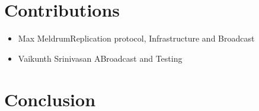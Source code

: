 \documentclass[12pt]{article}
\begin{document}
\section{Contributions}

\begin{itemize}
	\item{Max Meldrum\newline{}\newline{}Replication protocol, Infrastructure and Broadcast}
	\item{Vaikunth Srinivasan A\newline{}\newline{}Broadcast and Testing}

\end{itemize}




\section{Conclusion}



\end{document}
